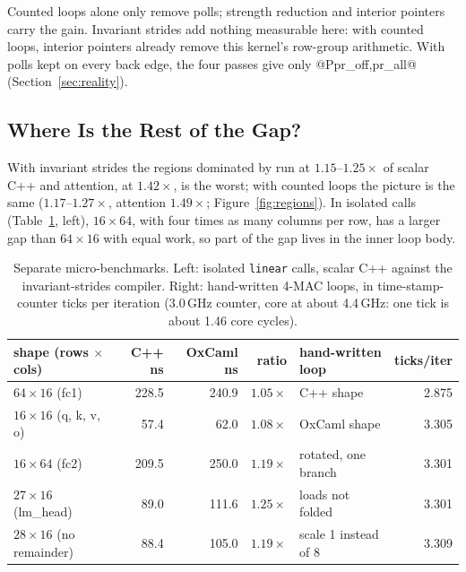 Counted loops alone only remove polls; strength reduction and interior
pointers carry the gain. Invariant strides add nothing measurable here: with
counted loops, interior pointers already remove this kernel's row-group
arithmetic. With polls kept on every back edge, the four passes give only
@P{pr_off,pr_all}@ (Section~\ref{sec:reality}).

\subsection{Where Is the Rest of the Gap?}
\label{sec:residual}
With invariant strides the regions dominated by  run at
$1.15$--$1.25\times$ of scalar C++ and attention, at $1.42\times$, is the
worst; with counted loops the picture is the same ($1.17$--$1.27\times$,
attention $1.49\times$; Figure~\ref{fig:regions}). In isolated calls
(Table~\ref{tab:shapes}, left), $16\times64$, with four times as many columns
per row, has a larger gap than $64\times16$ with equal work, so part of the
gap lives in the inner loop body.

\begin{table}[h]
  \centering
  \small
  \begin{tabular}{@{}lrrr@{\hspace{3em}}lr@{}}
    \toprule
    shape (rows $\times$ cols) & C++ ns & OxCaml ns & ratio & hand-written loop & ticks/iter \\
    \midrule
    $64\times16$ (fc1)      & 228.5 & 240.9 & $1.05\times$ & C++ shape & 2.875 \\
    $16\times16$ (q, k, v, o) & 57.4 & 62.0 & $1.08\times$ & OxCaml shape & 3.305 \\
    $16\times64$ (fc2)      & 209.5 & 250.0 & $1.19\times$ & \quad rotated, one branch & 3.301 \\
    $27\times16$ (lm\_head) & 89.0 & 111.6 & $1.25\times$ & \quad loads not folded & 3.301 \\
    $28\times16$ (no remainder) & 88.4 & 105.0 & $1.19\times$ & \quad scale 1 instead of 8 & 3.309 \\
    \bottomrule
  \end{tabular}
  \caption{Separate micro-benchmarks. Left: isolated \texttt{linear} calls,
  scalar C++ against the invariant-strides compiler. Right: hand-written 4-MAC
  loops, in time-stamp-counter ticks per iteration (3.0\,GHz counter, core at
  about 4.4\,GHz: one tick is about 1.46 core cycles).}
  \label{tab:shapes}
\end{table}

